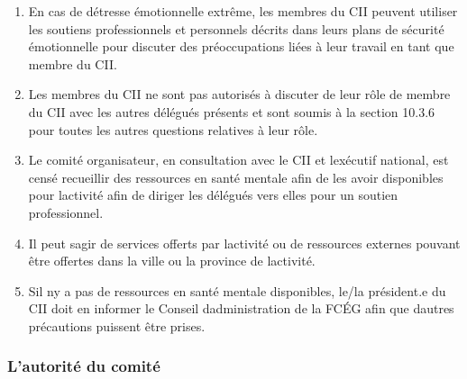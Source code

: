\begin{enumerate}
  \begin{enumerate}
   \item
    Une reconnaissance du travail émotionnel associé au rôle et une volonté de participer à ce travail.
   \item
    Un aperçu des soutiens professionnels disponibles pour le membre du CII.
   \item
    Un aperçu des soutiens personnels disponibles pour le membre du CII.
   \item
    Les coordonnées des personnes identifiées par le membre du CII comme soutiens émotionnels clés.
  \end{enumerate}
 \item
  En cas de détresse émotionnelle extrême, les membres du CII peuvent utiliser les soutiens professionnels et personnels décrits dans leurs plans de sécurité émotionnelle pour discuter des préoccupations liées à leur travail en tant que membre du CII.
 \item
  Les membres du CII ne sont pas autorisés à discuter de leur rôle de membre du CII avec les autres délégués présents et sont soumis à la section 10.3.6 pour toutes les autres questions relatives à leur rôle.
 \item
  Le comité organisateur, en consultation avec le CII et l\textquotesingle exécutif national, est censé recueillir des ressources en santé mentale afin de les avoir disponibles pour l\textquotesingle activité afin de diriger les délégués vers elles pour un soutien professionnel.
 \item
  Il peut s\textquotesingle agir de services offerts par l\textquotesingle activité ou de ressources externes pouvant être offertes dans la ville ou la province de l\textquotesingle activité.
 \item
  S\textquotesingle il n\textquotesingle y a pas de ressources en santé mentale disponibles, le/la président.e du CII doit en informer le Conseil d\textquotesingle administration de la FCÉG afin que d\textquotesingle autres précautions puissent être prises.
\end{enumerate}

\subsubsection{L'autorité du comité}
\label{l-autorite-du-comite}


